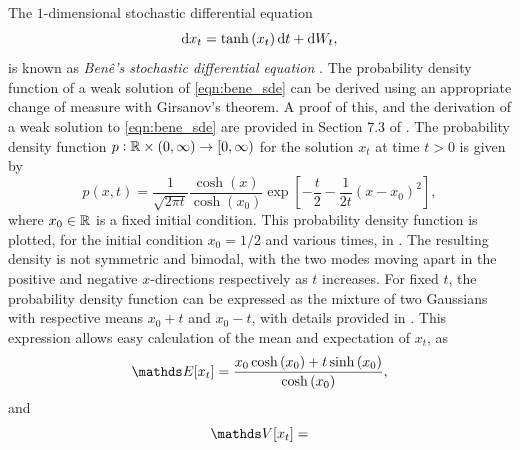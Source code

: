 \begin{example}\label{ex:bene_sde}
	The \(1\)-dimensional stochastic differential equation
	\begin{equation}
		\sde{x_t}{\tanh\left(x_t\right)}{},
		\label{eqn:bene_sde}
	\end{equation}
	is known as \emph{Ben\^e's stochastic differential equation} \citep{SarkkaSolin_2019_AppliedStochasticDifferential}.
	The probability density function of a weak solution of \eqref{eqn:bene_sde} can be derived using an appropriate change of measure with Girsanov's theorem.
	A proof of this, and the derivation of a weak solution to \eqref{eqn:bene_sde} are provided in Section 7.3 of \citet{SarkkaSolin_2019_AppliedStochasticDifferential}.
	The probability density function \(p: \mathbb{R} \times \left(0,\infty\right) \to \left[0,\infty\right)\) for the solution \(x_t\) at time \(t > 0\) is given by
	\begin{equation}\label{eqn:bene_sde_pdf}
		p(x,t) = \frac{1}{\sqrt{2\pi t}}\frac{\cosh\left(x\right)}{\cosh\left(x_0\right)}\exp\left[-\frac{t}{2} - \frac{1}{2t}\left(x - x_0\right)^2\right],
	\end{equation}
	where \(x_0 \in \mathbb{R}\) is a fixed initial condition.
	This probability density function is plotted, for the initial condition \(x_0 = 1/2\) and various times, in .
	The resulting density is not symmetric and bimodal, with the two modes moving apart in the positive and negative \(x\)-directions respectively as \(t\) increases.
	For fixed \(t\), the probability density function can be expressed as the mixture of two Gaussians with respective means \(x_0 + t\) and \(x_0 - t\), with details provided in .
	This expression allows easy calculation of the mean and expectation of \(x_t\), as
	\[
		\avg{x_t} = \frac{x_0\cosh\left(x_0\right) + t\sinh\left(x_0\right)}{\cosh\left(x_0\right)},
	\]
	and
	\[
		\var{x_t} =
	\]
\end{example}


\newcommand{\plotbenepdf}[2]{
	\begin{tikzpicture}\begin{axis}[
				ymin=0.0,
				xmin=-10.0,
				xmax=10.0,
				axis lines=center,
				axis on top=true,
				domain=-10:10,
				ylabel=$p$,
				xlabel=$x$,
				ytick=\empty,
				yticklabels={},
			]
			\addplot [mark=none,draw=black,thick,samples=500] {cosh(\x)*exp(-#2/2-1/(2 * #2)*(\x-#1)^2)/((2 * pi * #2)^(1/2) * cosh(#1))};
		\end{axis}
	\end{tikzpicture}
}

